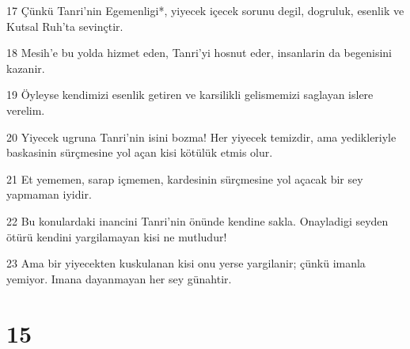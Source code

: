 \par 17 Çünkü Tanri'nin Egemenligi*, yiyecek içecek sorunu degil, dogruluk, esenlik ve Kutsal Ruh'ta sevinçtir.
\par 18 Mesih'e bu yolda hizmet eden, Tanri'yi hosnut eder, insanlarin da begenisini kazanir.
\par 19 Öyleyse kendimizi esenlik getiren ve karsilikli gelismemizi saglayan islere verelim.
\par 20 Yiyecek ugruna Tanri'nin isini bozma! Her yiyecek temizdir, ama yedikleriyle baskasinin sürçmesine yol açan kisi kötülük etmis olur.
\par 21 Et yememen, sarap içmemen, kardesinin sürçmesine yol açacak bir sey yapmaman iyidir.
\par 22 Bu konulardaki inancini Tanri'nin önünde kendine sakla. Onayladigi seyden ötürü kendini yargilamayan kisi ne mutludur!
\par 23 Ama bir yiyecekten kuskulanan kisi onu yerse yargilanir; çünkü imanla yemiyor. Imana dayanmayan her sey günahtir.

\chapter{15}

